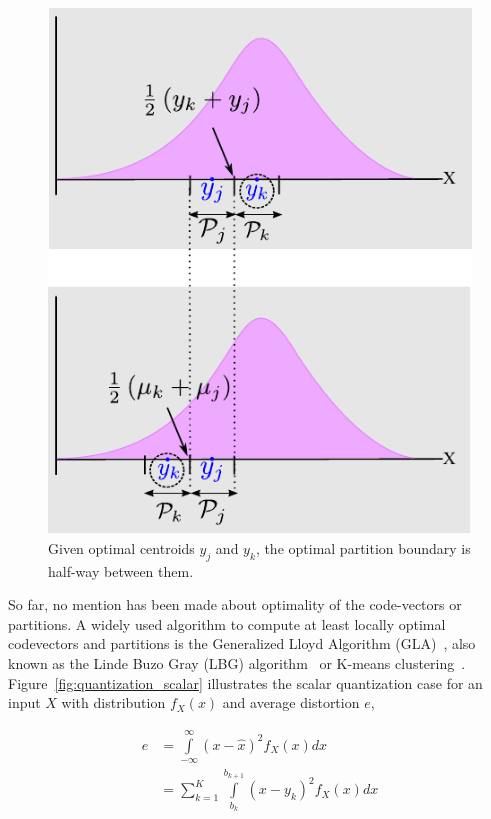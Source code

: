 \begin{Body}
								\begin{figure}[t]		
								\center	
								\includegraphics[height=0.5\textheight]{thesis/Quantization_optimalPartitions2.pdf}
								\caption{Given optimal centroids $y_j$ and $y_k$, the optimal partition boundary is half-way between them.}
								\label{fig:computing_optimal_partitions}
								\end{figure}

So far, no mention has been made about optimality of the code-vectors or partitions.  A widely used algorithm to compute at least locally optimal codevectors and partitions is the Generalized Lloyd Algorithm (GLA)~\cite{1991_BOOK_VQ_GershoGray}, also known as the Linde Buzo Gray (LBG) algorithm~\cite{1982_JNL_LeastSquaresQuantization_Lloyd} or K-means clustering~\cite{1967_CNF_Kmeans_Macqueen}.  Figure~\ref{fig:quantization_scalar} illustrates the scalar quantization case for an input $X$ with distribution $f_X(x)$ and average distortion $e$, 

\begin{equation}
\begin{array}{ll}
e 	&= \int\limits_{-\infty}^\infty(x - \hat{x})^2f_X(x)dx\\
	&=\sum\limits_{k=1}^K \int\limits_{b_k}^{b_{k+1}}(x-y_k)^2f_X(x)dx
\end{array}
\end{equation}


\end{Body}
